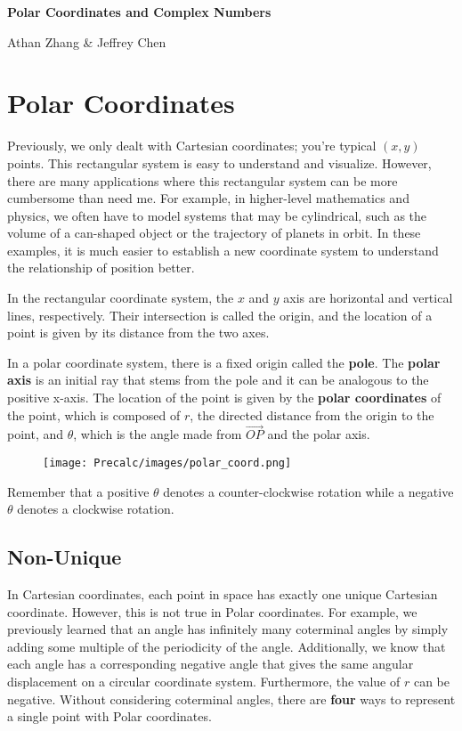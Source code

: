 \documentclass[11pt]{article}
\begin{document}
\textbf{\Huge Polar Coordinates and Complex Numbers}

Athan Zhang \& Jeffrey Chen

\section{Polar Coordinates}

Previously, we only dealt with Cartesian coordinates; you're typical $(x, y)$ points. This rectangular system is easy to understand and visualize. However, there are many applications where this rectangular system can be more cumbersome than need me. For example, in higher-level mathematics and physics, we often have to model systems that may be cylindrical, such as the volume of a can-shaped object or the trajectory of planets in orbit. In these examples, it is much easier to establish a new coordinate system to understand the relationship of position better.

In the rectangular coordinate system, the $x$ and $y$ axis are horizontal and vertical lines, respectively. Their intersection is called the origin, and the location of a point is given by its distance from the two axes.

In a polar coordinate system, there is a fixed origin called the \textbf{pole}. The \textbf{polar axis} is an initial ray that stems from the pole and it can be analogous to the positive x-axis. The location of the point is given by the \textbf{polar coordinates} of the point, which is composed of $r$, the directed distance from the origin to the point, and $\theta$, which is the angle made from $\overrightarrow{OP}$ and the polar axis.

\begin{figure}[H]
    \centering
    \texttt{[image: Precalc/images/polar\_coord.png]}
\end{figure}

Remember that a positive $\theta$ denotes a counter-clockwise rotation while a negative $\theta$ denotes a clockwise rotation.

\subsection{Non-Unique}

In Cartesian coordinates, each point in space has exactly one unique Cartesian coordinate. However, this is not true in Polar coordinates. For example, we previously learned that an angle has infinitely many coterminal angles by simply adding some multiple of the periodicity of the angle. Additionally, we know that each angle has a corresponding negative angle that gives the same angular displacement on a circular coordinate system. Furthermore, the value of $r$ can be negative. Without considering coterminal angles, there are \textbf{four} ways to represent a single point with Polar coordinates.
\end{document}
